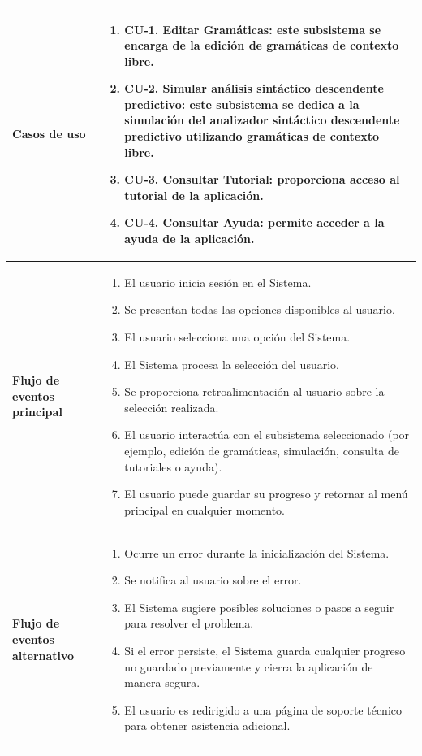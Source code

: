 \begin{longtable}[htp]{|>{\columncolor[rgb]{0.63,0.79,0.95}}m{6cm} | m{8.5cm} |}
    \textbf{Casos de uso} & \begin{enumerate}
        \item \textbf{CU-1. Editar Gramáticas}: este subsistema se encarga de la edición de gramáticas de contexto libre.                                   
        \item \textbf{CU-2. Simular análisis sintáctico descendente predictivo}: este subsistema se dedica a la simulación del analizador sintáctico descendente predictivo utilizando gramáticas de contexto libre.
        \item \textbf{CU-3. Consultar Tutorial}: proporciona acceso al tutorial de la aplicación.
        \item \textbf{CU-4. Consultar Ayuda}: permite acceder a la ayuda de la aplicación.
    \end{enumerate} 
    \\ \hline
    \textbf{Flujo de eventos principal} & \begin{enumerate}
        \item El usuario inicia sesión en el Sistema.
        \item Se presentan todas las opciones disponibles al usuario.
        \item El usuario selecciona una opción del Sistema.
        \item El Sistema procesa la selección del usuario.
        \item Se proporciona retroalimentación al usuario sobre la selección realizada.
        \item El usuario interactúa con el subsistema seleccionado (por ejemplo, edición de gramáticas, simulación, consulta de tutoriales o ayuda).
        \item El usuario puede guardar su progreso y retornar al menú principal en cualquier momento.
    \end{enumerate} \\ \hline
    \textbf{Flujo de eventos alternativo} & \begin{enumerate}
        \item Ocurre un error durante la inicialización del Sistema.
        \item Se notifica al usuario sobre el error.
        \item El Sistema sugiere posibles soluciones o pasos a seguir para resolver el problema.
        \item Si el error persiste, el Sistema guarda cualquier progreso no guardado previamente y cierra la aplicación de manera segura.
        \item El usuario es redirigido a una página de soporte técnico para obtener asistencia adicional.
    \end{enumerate} 
    \label{tabla71}
\end{longtable}

